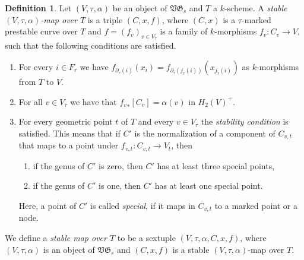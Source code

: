 \documentclass[11pt]{amsart}
\theoremstyle{definition}
\newtheorem{defn}[prop]{Definition}
\theoremstyle{remark}
\newcommand{\lst}{_{\ast}}
\newcommand{\GG}{{\mathfrak{G}}}
\newcommand{\VV}{{\mathfrak{V}}}
\newcommand{\del}{\partial}
\renewcommand{\t}{_{\tau}}
\theoremstyle{plain}
\theoremstyle{definition}
\theoremstyle{remark}
\begin{document}
\begin{defn} \label{dsm}
Let \((V,\tau,\alpha)\) be an object of \(\VV\GG_s\) and \(T\) a \(k\)-scheme. A {\em
stable \((V,\tau,\alpha)\)-map over \(T\)} is
a triple \((C,x,f)\), where \((C,x)\) is a \(\tau\)-marked prestable curve over \(T\)
and \(f=(f_v)_{v\in V\t}\) is a family of
\(k\)-morphisms \(f_v:C_v\rightarrow V\), such that the following conditions are
satisfied.
\begin{enumerate}
\item For every \(i\in F\t\) we have
\(f_{\del\t(i)}(x_i)=f_{\del\t(j\t(i))}(x_{j\t(i)})\) as \(k\)-morphisms from \(T\)
to \(V\).
\item For all \(v\in V\t\) we have that \({f_v}\lst[C_{v}]=\alpha(v)\) in
\(H_2(V)^+\).
\item For every geometric point \(t\) of \(T\) and every \(v\in V\t\) the {\em
stability condition }is satisfied. This means that if
\(C'\) is the normalization of a component of \(C_{v,t}\) that maps to a point
under \(f_{v,t}:C_{v,t}\rightarrow V_t\), then
\begin{enumerate}
\item if the genus of \(C'\) is zero, then \(C'\) has at least three special
points,
\item if the genus of \(C'\) is one, then \(C'\) has at least one special point.
\end{enumerate}
Here, a point of \(C'\) is called {\em special}, if it maps in \(C_{v,t}\) to a
marked point or a node.
\end{enumerate}

We define a {\em stable map over \(T\)} to be a sextuple \((V,\tau,\alpha,C,x,f)\),
where \((V,\tau,\alpha)\) is an object
of \(\VV\GG_s\) and \((C,x,f)\) is a stable \((V,\tau,\alpha)\)-map over \(T\).


\end{defn}
\end{document}
